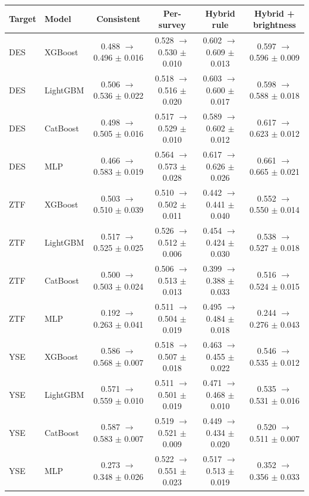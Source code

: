 \begin{tabular}{@{}llcccc@{}}
\toprule
Target & Model & Consistent & Per-survey & Hybrid rule & Hybrid + brightness \\
\midrule
DES & XGBoost & 0.488 $\to$ 0.496 $\pm$ 0.016 & 0.528 $\to$ 0.530 $\pm$ 0.010 & 0.602 $\to$ 0.609 $\pm$ 0.013 & 0.597 $\to$ 0.596 $\pm$ 0.009 \\
DES & LightGBM & 0.506 $\to$ 0.536 $\pm$ 0.022 & 0.518 $\to$ 0.516 $\pm$ 0.020 & 0.603 $\to$ 0.600 $\pm$ 0.017 & 0.598 $\to$ 0.588 $\pm$ 0.018 \\
DES & CatBoost & 0.498 $\to$ 0.505 $\pm$ 0.016 & 0.517 $\to$ 0.529 $\pm$ 0.010 & 0.589 $\to$ 0.602 $\pm$ 0.012 & 0.617 $\to$ 0.623 $\pm$ 0.012 \\
DES & MLP & 0.466 $\to$ 0.583 $\pm$ 0.019 & 0.564 $\to$ 0.573 $\pm$ 0.028 & 0.617 $\to$ 0.626 $\pm$ 0.026 & 0.661 $\to$ 0.665 $\pm$ 0.021 \\
ZTF & XGBoost & 0.503 $\to$ 0.510 $\pm$ 0.039 & 0.510 $\to$ 0.502 $\pm$ 0.011 & 0.442 $\to$ 0.441 $\pm$ 0.040 & 0.552 $\to$ 0.550 $\pm$ 0.014 \\
ZTF & LightGBM & 0.517 $\to$ 0.525 $\pm$ 0.025 & 0.526 $\to$ 0.512 $\pm$ 0.006 & 0.454 $\to$ 0.424 $\pm$ 0.030 & 0.538 $\to$ 0.527 $\pm$ 0.018 \\
ZTF & CatBoost & 0.500 $\to$ 0.503 $\pm$ 0.024 & 0.506 $\to$ 0.513 $\pm$ 0.013 & 0.399 $\to$ 0.388 $\pm$ 0.033 & 0.516 $\to$ 0.524 $\pm$ 0.015 \\
ZTF & MLP & 0.192 $\to$ 0.263 $\pm$ 0.041 & 0.511 $\to$ 0.504 $\pm$ 0.019 & 0.495 $\to$ 0.484 $\pm$ 0.018 & 0.244 $\to$ 0.276 $\pm$ 0.043 \\
YSE & XGBoost & 0.586 $\to$ 0.568 $\pm$ 0.007 & 0.518 $\to$ 0.507 $\pm$ 0.018 & 0.463 $\to$ 0.455 $\pm$ 0.022 & 0.546 $\to$ 0.535 $\pm$ 0.012 \\
YSE & LightGBM & 0.571 $\to$ 0.559 $\pm$ 0.010 & 0.511 $\to$ 0.501 $\pm$ 0.019 & 0.471 $\to$ 0.468 $\pm$ 0.010 & 0.535 $\to$ 0.531 $\pm$ 0.016 \\
YSE & CatBoost & 0.587 $\to$ 0.583 $\pm$ 0.007 & 0.519 $\to$ 0.521 $\pm$ 0.009 & 0.449 $\to$ 0.434 $\pm$ 0.020 & 0.520 $\to$ 0.511 $\pm$ 0.007 \\
YSE & MLP & 0.273 $\to$ 0.348 $\pm$ 0.026 & 0.522 $\to$ 0.551 $\pm$ 0.023 & 0.517 $\to$ 0.513 $\pm$ 0.019 & 0.352 $\to$ 0.356 $\pm$ 0.033 \\
\bottomrule
\end{tabular}
